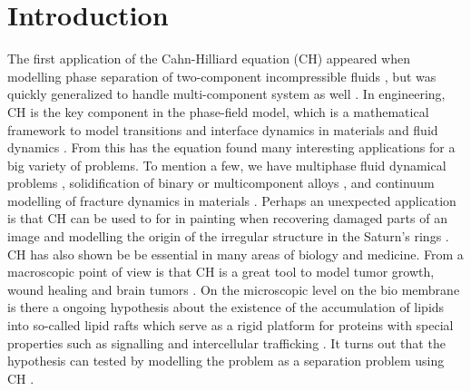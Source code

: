 \section{Introduction}\label{sec:introduction}



The first application of the Cahn-Hilliard equation (CH) appeared when modelling phase separation of two-component incompressible fluids \cite{cahn1958free, cahn1959free, cahn1961spinodal}, but was quickly generalized to handle multi-component system
as well \cite{bosch2015fractional, eyre1993systems, toth2016phase, miranville2017cahn}. In engineering, CH is the key component in
the phase-field model, which is a mathematical framework to model transitions and interface dynamics in materials and fluid dynamics \cite{steinbach2009phase, chen2002phase}.
From this has the equation found many interesting applications for a big variety of problems. To mention a few, we have
multiphase fluid dynamical problems \cite{badalassi2003computation, li2016lattice, kim2012phase, shen2010phase}, solidification of binary or multicomponent alloys \cite{kim1999phase, echebarria2004quantitative}, and continuum modelling of fracture dynamics in
materials \cite{kuhn2010continuum, li2015phase}. Perhaps an unexpected application is that CH can be used to for in painting when recovering damaged parts of an image \cite{bertozzi2006inpainting, burger2009cahn, bosch2015fractional, brkic2020image}
and modelling the origin of the irregular structure in the Saturn's rings \cite{tremaine2003origin}.
CH has also shown be be essential in many areas of biology and medicine. From a macroscopic point of view is that CH is a great tool to model tumor growth, wound healing and brain tumors \cite{agosti2017cahn, cristini2009nonlinear}.
On the microscopic level on the bio membrane is there a ongoing hypothesis about the existence of the accumulation of lipids into so-called lipid rafts which serve as a rigid platform for proteins with
special properties such as signalling and intercellular trafficking \cite{ levental2020lipid, hancock2006lipid, munro2003lipid, simons1997functional}. It turns out that the hypothesis can tested by modelling the problem as a separation problem using
CH \cite{miller2020divide, garcke2016coupled, yushutin2019computational}.

